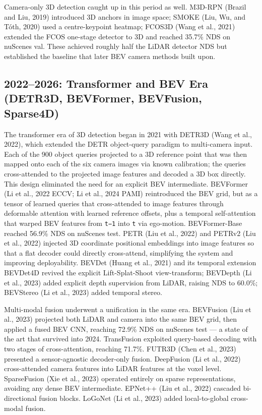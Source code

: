 Camera-only 3D detection caught up in this period as well. M3D-RPN (Brazil and Liu, 2019) introduced 3D anchors in image space; SMOKE (Liu, Wu, and Tóth, 2020) used a centre-keypoint heatmap; FCOS3D (Wang et al., 2021) extended the FCOS one-stage detector to 3D and reached 35.7\% NDS on nuScenes val. These achieved roughly half the LiDAR detector NDS but established the baseline that later BEV camera methods built upon.

\subsection{2022--2026: Transformer and BEV Era (DETR3D, BEVFormer, BEVFusion, Sparse4D)}\label{transformer-and-bev-era-detr3d-bevformer-bevfusion-sparse4d}

The transformer era of 3D detection began in 2021 with DETR3D (Wang et al., 2022), which extended the DETR object-query paradigm to multi-camera input. Each of the 900 object queries projected to a 3D reference point that was then mapped onto each of the six camera images via known calibration; the queries cross-attended to the projected image features and decoded a 3D box directly. This design eliminated the need for an explicit BEV intermediate. BEVFormer (Li et al., 2022 ECCV; Li et al., 2024 PAMI) reintroduced the BEV grid, but as a tensor of learned queries that cross-attended to image features through deformable attention with learned reference offsets, plus a temporal self-attention that warped BEV features from \texttt{t−1} into \texttt{t} via ego-motion. BEVFormer-Base reached 56.9\% NDS on nuScenes test. PETR (Liu et al., 2022) and PETRv2 (Liu et al., 2022) injected 3D coordinate positional embeddings into image features so that a flat decoder could directly cross-attend, simplifying the system and improving deployability. BEVDet (Huang et al., 2021) and its temporal extension BEVDet4D revived the explicit Lift-Splat-Shoot view-transform; BEVDepth (Li et al., 2023) added explicit depth supervision from LiDAR, raising NDS to 60.0\%; BEVStereo (Li et al., 2023) added temporal stereo.

Multi-modal fusion underwent a unification in the same era. BEVFusion (Liu et al., 2023) projected both LiDAR and camera into the same BEV grid, then applied a fused BEV CNN, reaching 72.9\% NDS on nuScenes test --- a state of the art that survived into 2024. TransFusion exploited query-based decoding with two stages of cross-attention, reaching 71.7\%. FUTR3D (Chen et al., 2023) presented a sensor-agnostic decoder-only fusion. DeepFusion (Li et al., 2022) cross-attended camera features into LiDAR features at the voxel level. SparseFusion (Xie et al., 2023) operated entirely on sparse representations, avoiding any dense BEV intermediate. EPNet++ (Liu et al., 2022) cascaded bi-directional fusion blocks. LoGoNet (Li et al., 2023) added local-to-global cross-modal fusion.

